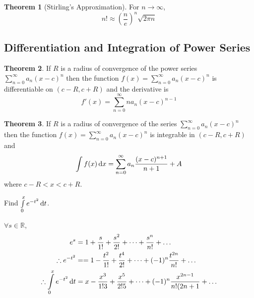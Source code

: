 \documentclass[fleqn, a4paper, 12pt, twoside]{article}
\theoremstyle{definition}
\theoremstyle{theorem}
\newtheorem{theorem}{Theorem}
\begin{document}
{\begin{theorem}[Stirling's Approximation]
	For $n \to \infty$,
	\begin{equation*}
		n! \approx \left( \dfrac{n}{e} \right)^n \sqrt{2 \pi n}
	\end{equation*}
\end{theorem}

\subsection{Differentiation and Integration of Power Series}

\begin{theorem}
	If $R$ is a radius of convergence of the power series $\sum\limits_{n = 0}^{\infty} a_n (x - c)^n$ then the function $f(x) = \sum\limits_{n = 0}^{\infty} a_n (x - c)^n$ is differentiable on $(c - R, c + R)$ and the derivative is
	\begin{equation*}
		f'(x) = \sum\limits_{n = 0}^{\infty} n a_n (x - c)^{n - 1}
	\end{equation*}
\end{theorem}

\begin{theorem}
	If $R$ is a radius of convergence of the series $\sum\limits_{n = 0}^{\infty} a_n (x - c)^n$ then the function $f(x) = \sum\limits_{n = 0}^{\infty} a_n (x - c)^n$ is integrable in $(c - R, c + R)$ and 
	\begin{equation*}
		\int f(x) \dif x = \sum\limits_{n = 0}^{\infty} a_n \dfrac{(x - c)^{n + 1}}{n + 1} + A
	\end{equation*}
	where $c - R < x < c + R$.
\end{theorem}

\begin{question}
	Find $\int\limits_{0}^{x} e^{-t^2} \dif t$.
\end{question}

\begin{solution}
	$\forall s \in \mathbb{R}$,
	\begin{align*}
		e^s &= 1 + \dfrac{s}{1!} + \dfrac{s^2}{2!} + \dots + \dfrac{s^n}{n!} + \dots\\
		\therefore e^{-t^2} &= =1 - \dfrac{t^2}{1!} + \dfrac{t^4}{2!} + \dots + (-1)^n \dfrac{t^{2 n}}{n!} + \dots\\
		\therefore \int\limits_{0}^{x} e^{-t^2} \dif t &= x - \dfrac{x^3}{1! 3} + \dfrac{x^5}{2! 5} + \dots + (-1)^n \dfrac{x^{2 n - 1}}{n! (2 n + 1} + \dots
	\end{align*}
\end{solution}

}
\end{document}
